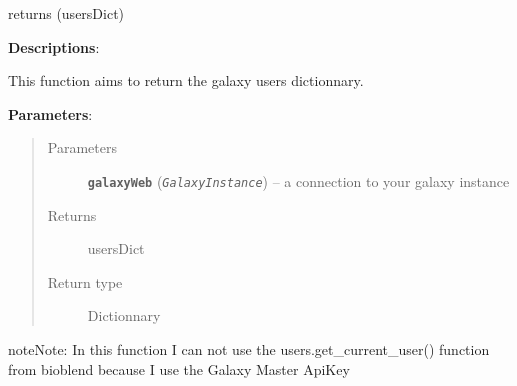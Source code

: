 \documentclass[letterpaper,10pt,english]{sphinxmanual}
\begin{document}
\begin{fulllineitems}
\label{datamanagerpkg:datamanagerpkg.GalaxyCommunication_data_manager.returnGalaxyUsers}
returns (usersDict)

\textbf{Descriptions}:

This function aims to return the galaxy users dictionnary.

\textbf{Parameters}:
\begin{quote}\begin{description}
\item[{Parameters}] \leavevmode
\textbf{\texttt{galaxyWeb}} (\emph{\texttt{GalaxyInstance}}) -- a connection to your galaxy instance

\item[{Returns}] \leavevmode
usersDict

\item[{Return type}] \leavevmode
Dictionnary

\end{description}\end{quote}

\begin{notice}{note}{Note:}
In this function I can not use the users.get\_current\_user()
function from bioblend because I use the Galaxy Master ApiKey
\end{notice}

\end{fulllineitems}

\end{document}
